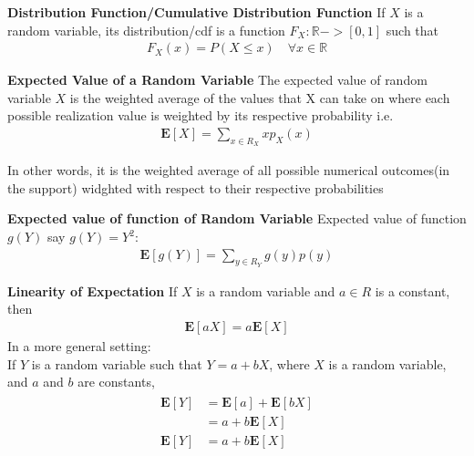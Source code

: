\documentclass[10pt,a4paper]{article}
\newcommand{\R}{\mathbb{R}}
\begin{document}
	\begin{defn}{\textbf{Distribution Function/Cumulative Distribution Function}}
		If $X$ is a random variable, its distribution/cdf is a function $F_X : \R -> [0,1]$ such that \\
		\begin{align}
			F_X(x) = P(X \le x) \quad \forall x \in \R
		\end{align}
	\end{defn}

	\begin{defn}{\textbf{Expected Value of a Random Variable}}
	The expected value of random variable $X$ is the weighted average of the values that X can take on where each possible realization value is weighted by its respective probability i.e. \\
	\begin{align}
		\mathbf{E}[X] = \sum\limits_{x \in R_X}xp_X(x)
	\end{align}
	
	In other words, it is the weighted average of all possible numerical outcomes(in the support) widghted with respect to their respective probabilities
	\end{defn}

	\begin{defn}{\textbf{Expected value of function of Random Variable}}
		Expected value of function $g(Y)$ say
		$g(Y) = Y^2$:
		\begin{align}
			\mathbf{E}[g(Y)] = \sum_{y \in R_Y}g(y)p(y)
		\end{align}
	\end{defn}

	\begin{defn}{\textbf{Linearity of Expectation}}
		If $X$ is a random variable and $a \in R$ is a constant, then
		\begin{align}
			\mathbf{E}[aX] = a\mathbf{E}[X]
		\end{align}
		In a more general setting:\\
		If $Y$ is a random variable such that $Y = a + bX$, where 
		$X$ is a random variable, and $a$ and $b$ are constants,
		\begin{align}
			\begin{split}
				\mathbf{E}[Y] & = \mathbf{E}[a] + \mathbf{E}[bX] \\
				     & = a + b\mathbf{E}[X] \\
				\mathbf{E}[Y] & = a + b\mathbf{E}[X] \\
			\end{split}
		\end{align}
		
	\end{defn}
\end{document}
